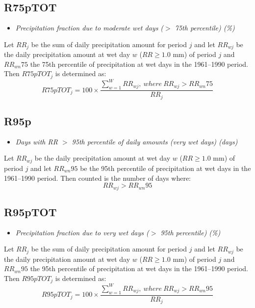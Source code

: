\documentclass[a4paper,11pt]{article}
\begin{document}
\subsection*{R75pTOT}
\begin{itemize}
\item \textit{Precipitation fraction due to moderate wet days ($>$
75th percentile) (\%)}
\end{itemize}
Let $RR_{j}$ be the sum of daily precipitation amount for period $j$
and let $RR_{wj}$ be the daily precipitation amount at wet day $w$
($RR\geq1.0$ mm) of period $j$ and $RR_{wn}75$ the 75th percentile of
precipitation at wet days in the 1961--1990 period. Then $R75pTOT_{j}$
is determined as:
\begin{equation*}
R75pTOT_{j} = 100 \times \frac{\sum_{w=1}^{W}RR_{wj},\:where\:
RR_{wj}>RR_{wn}75}{RR_{j}}
\end{equation*}

\subsection*{R95p}
\begin{itemize}
\item \textit{Days with RR $>$ 95th percentile of daily amounts
(very wet days) (days)}
\end{itemize}
Let $RR_{wj}$ be the daily precipitation amount at wet day $w$
($RR\geq1.0$ mm) of period $j$ and let $RR_{wn}95$ be the 95th
percentile of precipitation at wet days in the 1961--1990 period. Then
counted is the number of days where:
\begin{equation*}
RR_{wj} > RR_{wn}95
\end{equation*}

\subsection*{R95pTOT}
\begin{itemize}
\item \textit{Precipitation fraction due to very wet days ($>$ 95th
percentile) (\%)}
\end{itemize}
Let $RR_{j}$ be the sum of daily precipitation amount for period $j$
and let $RR_{wj}$ be the daily precipitation amount at wet day $w$
($RR\geq1.0$ mm) of period $j$ and $RR_{wn}95$ the 95th percentile of
precipitation at wet days in the 1961--1990 period. Then $R95pTOT_{j}$
is determined as:
\begin{equation*}
R95pTOT_{j} = 100 \times \frac{\sum_{w=1}^{W}RR_{wj},\:where\:
RR_{wj}>RR_{wn}95}{RR_{j}}
\end{equation*}
\end{document}
